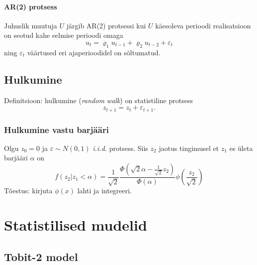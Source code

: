 \documentclass[a4paper]{article}
\newcommand{\iid}{\textit{i.i.d.}\xspace}
\numberwithin{equation}{subsection}
\begin{document}
\paragraph{AR(2) protsess}

Juhuslik muutuja $U$ järgib AR(2) protsessi kui $U$ käesoleva perioodi
realisatsioon on seotud kahe eelmise perioodi omaga
\begin{equation}
  u_t = \varrho_1 u_{t-1} + \varrho_2 u_{t-2} + \varepsilon_t
\end{equation}
ning $\varepsilon_t$ väärtused eri ajaperioodidel on sõltumatud.


\subsection{Hulkumine}

Definitsioon: hulkumine (\textit{random walk}) on statistiline
protsess
\begin{equation}
z_{t+1} = z_t + \varepsilon_{t+1}.
\end{equation}


\subsubsection{Hulkumine vastu barjääri}
Olgu $z_0=0$ ja $\varepsilon \sim N(0,1)$ \iid protsess.
Siis $z_2$ jaotus tingimusel et $z_1$ es ületa barjääri $\alpha$ on
\begin{equation}
f(z_2|z_1<\alpha) = 
  \frac{1}{\sqrt{2}}
  \frac{\Phi\left(\sqrt{2}\alpha - 
                  \displaystyle\frac{1}{\sqrt{2}}z_2\right)}
    {\Phi(\alpha)}
  \phi \left( \frac{z_2}{\sqrt{2}} \right)
\end{equation}
Tõestus: kirjuta $\phi(x)$ lahti ja integreeri.


\newpage
\section{Statistilised mudelid}
\subsection{Tobit-2 model}
\end{document}
